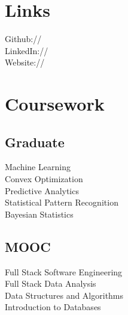 \documentclass[]{20161017-v}
\begin{document}
\begin{minipage}[t]{0.33\textwidth}

\section{Links} 
Github:// \href{https://github.com/karlzhang-hhg}{} \\
LinkedIn://  \href{www.linkedin.com/in/kungang-zhang}{} \\
Website:// \href{https://sites.google.com/a/u.northwestern.edu/kungang-zhang/}{} \\
\sectionsep


\section{Coursework}
\subsection{Graduate}
Machine Learning \\
Convex Optimization \\
Predictive Analytics \\
Statistical Pattern Recognition \\
Bayesian Statistics \\
\sectionsep

\subsection{MOOC}
Full Stack Software Engineering \\
Full Stack Data Analysis \\
Data Structures and Algorithms \\
Introduction to Databases \\
\sectionsep



\end{minipage}
\end{document}
